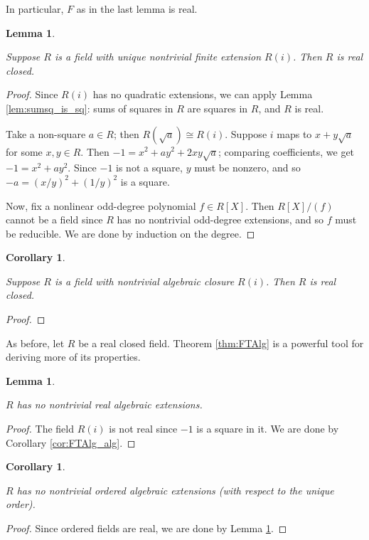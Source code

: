 \documentclass{article}
\newtheorem{lemma}[theorem]{Lemma}
\newtheorem{corollary}[theorem]{Corollary}
\newcommand{\leanok}{}
\newcommand{\lean}[1]{}
\newcommand{\uses}[1]{}
\begin{document}
In particular, $F$ as in the last lemma is real.

\begin{lemma}
  \label{lem:FTAlg_converse}
  \uses{def:RCF}
  Suppose $R$ is a field with unique nontrivial finite extension $R(i)$. Then $R$ is real closed.
\end{lemma}
\begin{proof}
  \uses{lem:sumsq_is_sq, lem:FTAlg_converse_alg_closure}
  Since $R(i)$ has no quadratic extensions, we can apply Lemma \ref{lem:sumsq_is_sq}: sums of squares in $R$ are squares in $R$, and $R$ is real.

  Take a non-square $a\in R$; then $R(\sqrt{a})\cong R(i)$. Suppose $i$ maps to $x+y\sqrt{a}$ for some $x,y\in R$. Then $-1=x^2+ay^2+2xy\sqrt{a}$; comparing coefficients, we get $-1=x^2+ay^2$. Since $-1$ is not a square, $y$ must be nonzero, and so $-a=(x/y)^2+(1/y)^2$ is a square.

  Now, fix a nonlinear odd-degree polynomial $f\in R[X]$. Then $R[X]/(f)$ cannot be a field since $R$ has no nontrivial odd-degree extensions, and so $f$ must be reducible. We are done by induction on the degree.
\end{proof}

\begin{corollary}
  \label{lem:FTAlg_converse_alg_closure}
  \uses{def:RCF}
  Suppose $R$ is a field with nontrivial algebraic closure $R(i)$. Then $R$ is real closed.
\end{corollary}
\begin{proof}
  \uses{lem:sumsq_is_sq}
\end{proof}

As before, let $R$ be a real closed field. Theorem \ref{thm:FTAlg} is a powerful tool for deriving more of its properties.

\begin{lemma}
  \label{lem:RCF_max}
  \uses{def:RCF}
  \lean{IsRealClosed.finite_of_isAlgebraic, IsRealClosed.finrank_eq_one_or_two_of_finite}
  \leanok
  $R$ has no nontrivial real algebraic extensions.
\end{lemma}
\begin{proof}
  \uses{cor:FTAlg_alg}
  \leanok
  The field $R(i)$ is not real since $-1$ is a square in it. We are done by Corollary \ref{cor:FTAlg_alg}.
\end{proof}

\begin{corollary}
  \label{lem:RCF_max_ord}
  \uses{def:RCF,lem:RCF_ord_unique}
  \lean{IsRealClosed.bijective_algebraMap_of_isOrderedAlgebra}
  \leanok
  $R$ has no nontrivial ordered algebraic extensions (with respect to the unique order).
\end{corollary}
\begin{proof}
  \uses{lem:RCF_max,thm:ord_iff_real}
  \leanok
  Since ordered fields are real, we are done by Lemma \ref{lem:RCF_max}.
\end{proof}
\end{document}
